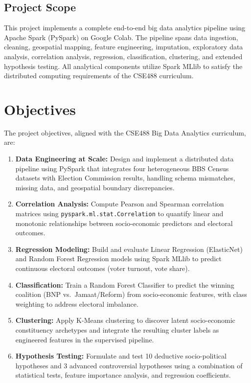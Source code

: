 \documentclass[12pt, a4paper]{article}
\begin{document}
\subsection{Project Scope}
This project implements a complete end-to-end big data analytics pipeline using Apache Spark (PySpark) on Google Colab. The pipeline spans data ingestion, cleaning, geospatial mapping, feature engineering, imputation, exploratory data analysis, correlation analysis, regression, classification, clustering, and extended hypothesis testing. All analytical components utilize Spark MLlib to satisfy the distributed computing requirements of the CSE488 curriculum.

\section{Objectives}

The project objectives, aligned with the CSE488 Big Data Analytics curriculum, are:

\begin{enumerate}
    \item \textbf{Data Engineering at Scale:} Design and implement a distributed data pipeline using PySpark that integrates four heterogeneous BBS Census datasets with Election Commission results, handling schema mismatches, missing data, and geospatial boundary discrepancies.
    \item \textbf{Correlation Analysis:} Compute Pearson and Spearman correlation matrices using \texttt{pyspark.ml.stat.Correlation} to quantify linear and monotonic relationships between socio-economic predictors and electoral outcomes.
    \item \textbf{Regression Modeling:} Build and evaluate Linear Regression (ElasticNet) and Random Forest Regression models using Spark MLlib to predict continuous electoral outcomes (voter turnout, vote share).
    \item \textbf{Classification:} Train a Random Forest Classifier to predict the winning coalition (BNP vs.\ Jamaat/Reform) from socio-economic features, with class weighting to address electoral imbalance.
    \item \textbf{Clustering:} Apply K-Means clustering to discover latent socio-economic constituency archetypes and integrate the resulting cluster labels as engineered features in the supervised pipeline.
    \item \textbf{Hypothesis Testing:} Formulate and test 10 deductive socio-political hypotheses and 3 advanced controversial hypotheses using a combination of statistical tests, feature importance analysis, and regression coefficients.
\end{enumerate}
\end{document}
